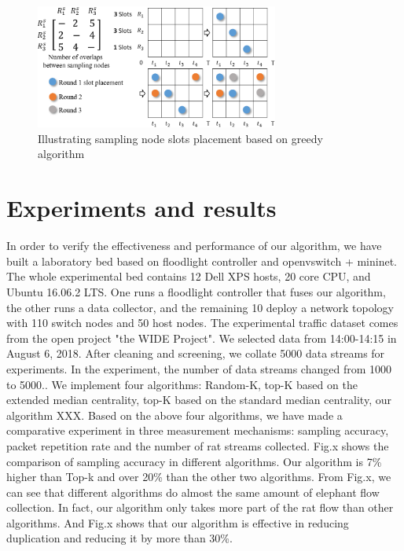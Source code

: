 \documentclass[conference,compsoc]{IEEEtran}
\begin{document}
\begin{figure}[!hhhhhhhhhht]
\centering
\includegraphics[width=8cm]{images/greedy_for_order_slot.png}
\caption{Illustrating sampling node slots placement based on greedy algorithm}
\label{slot_order}
\end{figure}

\section{Experiments and results}
In order to verify the effectiveness and performance of our algorithm, we have built a laboratory bed based on floodlight controller and openvswitch + mininet. The whole experimental bed contains 12 Dell XPS hosts, 20 core CPU, and Ubuntu 16.06.2 LTS. One runs a floodlight controller that fuses our algorithm, the other runs a data collector, and the remaining 10 deploy a network topology with 110 switch nodes and 50 host nodes. The experimental traffic dataset comes from the open project "the WIDE Project". We selected data from 14:00-14:15 in August 6, 2018. After cleaning and screening, we collate 5000 data streams for experiments. In the experiment, the number of data streams changed from 1000 to 5000..
We implement four algorithms: Random-K, top-K based on the extended median centrality, top-K based on the standard median centrality, our algorithm XXX. Based on the above four algorithms, we have made a comparative experiment in three measurement mechanisms: sampling accuracy, packet repetition rate and the number of rat streams collected.
Fig.x shows the comparison of sampling accuracy in different algorithms. Our algorithm is 7\% higher than Top-k and over 20\% than the other two algorithms. From Fig.x, we can see that different algorithms do almost the same amount of elephant flow collection. In fact, our algorithm only takes more part of the rat flow than other algorithms. And Fig.x shows that our algorithm is effective in reducing duplication and reducing it by more than 30\%.

\end{document}
